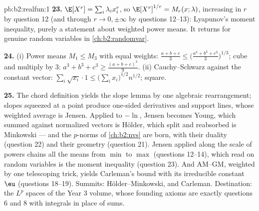 \begin{solution}{pb:b2:realfun:1}
\textbf{23.} $\E[X^r] = \sum_i\lambda_ix_i^r$, so
$\E[X^r]^{1/r} = M_r(x; \lambda)$, increasing in $r$ by
question 12 (and through $r \to 0, \pm\infty$ by questions
12--13): Lyapunov's moment inequality, purely a statement about
weighted power means. It returns for genuine random variables
in \cref{ch:b2:randomvar}.

\textbf{24.} (i) Power means $M_1 \leq M_3$ with equal weights:
$\frac{a+b+c}3 \leq \bigl(\frac{a^3+b^3+c^3}3\bigr)^{1/3}$;
cube and multiply by $3$: $a^3 + b^3 + c^3 \geq
\frac{(a+b+c)^3}9$. (ii) Cauchy--Schwarz against the constant
vector: $\sum_i\sqrt{x_i}\cdot1 \leq
\bigl(\sum_ix_i\bigr)^{1/2}n^{1/2}$; square.

\textbf{25.} The chord definition yields the slope lemma by one
algebraic rearrangement; slopes squeezed at a point produce
one-sided derivatives and support lines, whose weighted average
is Jensen. Applied to $-\ln$, Jensen becomes Young, which
summed against normalized vectors is H\"older, which split and
reabsorbed is Minkowski --- and the $p$-norms of
\cref{ch:b2:nvs} are born, with their duality (question 22)
and their geometry (question 21). Jensen applied along the
scale of powers chains all the means from $\min$ to $\max$
(questions 12--14), which read on random variables is the
moment inequality (question 23). And AM--GM, weighted by one
telescoping trick, yields Carleman's bound with its
irreducible constant $\eu$ (questions 18--19). Summits:
H\"older--Minkowski, and Carleman. Destination: the $L^p$
spaces of the Year 3 volume, whose founding axioms are exactly
questions 6 and 8 with integrals in place of sums.
\end{solution}
